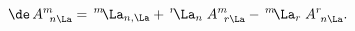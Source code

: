 \begin{equation} \label{atransa}
\de\,A^m_{\ \,n\La}=\,^m\!\La_{n,\La}+\,^r\!\La_n\;A^m_{\ \,r\La}-\,^m\!\La_r\;A^r_{\ n\La}.
\end{equation}

